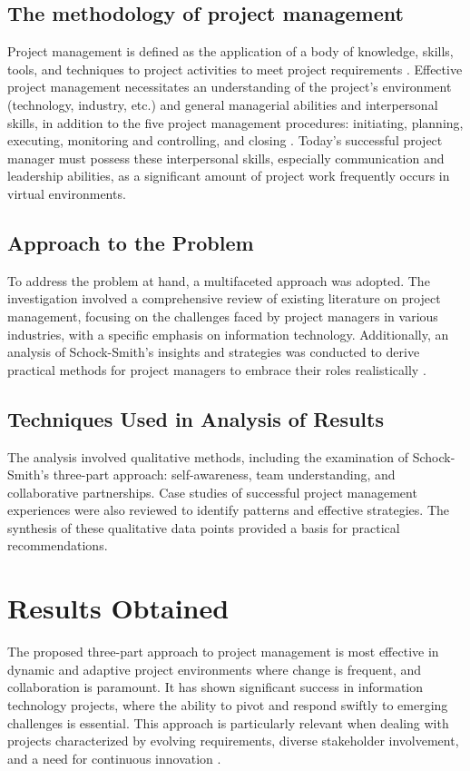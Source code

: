 \documentclass[11pt]{article}
\begin{document}
\subsection{The methodology of project management}
Project management is defined as the application of a body of knowledge, skills, tools, and techniques to project activities to meet project requirements \cite{ProjectManagementInstitute2009}. Effective project management necessitates an understanding of the project's environment (technology, industry, etc.) and general managerial abilities and interpersonal skills, in addition to the five project management procedures: initiating, planning, executing, monitoring and controlling, and closing \cite{Horine2009}. Today's successful project manager must possess these interpersonal skills, especially communication and leadership abilities, as a significant amount of project work frequently occurs in virtual environments.

\subsection{Approach to the Problem}
To address the problem at hand, a multifaceted approach was adopted. The investigation involved a comprehensive review of existing literature on project management, focusing on the challenges faced by project managers in various industries, with a specific emphasis on information technology. Additionally, an analysis of Schock-Smith's insights and strategies was conducted to derive practical methods for project managers to embrace their roles realistically \cite{SchockSmith2017}.

\subsection{Techniques Used in Analysis of Results}
The analysis involved qualitative methods, including the examination of Schock-Smith's three-part approach: self-awareness, team understanding, and collaborative partnerships. Case studies of successful project management experiences were also reviewed to identify patterns and effective strategies. The synthesis of these qualitative data points provided a basis for practical recommendations.


\section{Results Obtained}
The proposed three-part approach to project management is most effective in dynamic and adaptive project environments where change is frequent, and collaboration is paramount. It has shown significant success in information technology projects, where the ability to pivot and respond swiftly to emerging challenges is essential. This approach is particularly relevant when dealing with projects characterized by evolving requirements, diverse stakeholder involvement, and a need for continuous innovation \cite{SchockSmith2017}.
\end{document}
